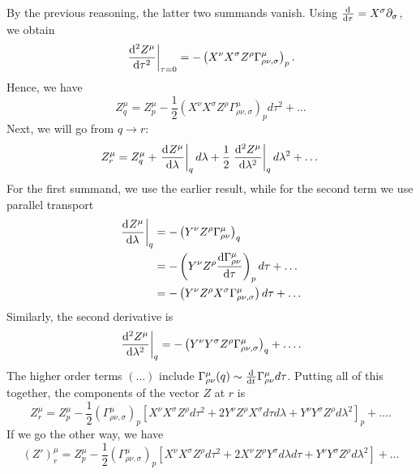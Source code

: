 By the previous reasoning, the latter two summands vanish.
Using $\dv[]{}{\tau} = X^{\sigma} \partial_{\sigma}$, we obtain
\begin{equation}
  \left.\dv[2]{Z^{\mu}}{\tau}\right\rvert_{\tau =0} = - \left( X^{\nu}X^{\sigma} Z^{\rho} \Gamma^{\mu}_{\rho\nu, \sigma} \right)_p.
\end{equation}
Hence, we have
\begin{equation}
  Z^{\mu}_q = Z^{\mu}_p - \frac{1}{2} (X^{\nu}X^{\sigma} Z^{\rho} \Gamma^{\mu}_{\rho\nu, \sigma})_p d\tau^2 + \dots
\end{equation}
Next, we will go from $q \to r$:
\begin{equation}
  Z^{\mu}_r = Z^{\mu}_q + \left.\dv[]{Z^{\mu}}{\lambda}\right\rvert_{q} d\lambda + \frac{1}{2} \left.\dv[2]{Z^{\mu}}{\lambda}\right\rvert_{q} d\lambda^2 + \dots
\end{equation}
For the first summand, we use the earlier result, while for the second term we use parallel transport
\begin{align}
  \left.\dv[]{Z^{\mu}}{\lambda}\right\rvert_{q} &= -\left( Y^{\nu} Z^{\rho} \Gamma^{\mu}_{\rho\nu} \right)_q \\
						&= - \left( Y^{\nu} Z^{\rho} \dv{\Gamma^{\mu}_{\rho\nu}}{\tau} \right)_p d \tau + \dots \\
						&= - \left( Y^{\nu} Z^{\rho} X^{\sigma} \Gamma^{\mu}_{\rho\nu, \sigma} \right) d\tau + \dots
\end{align}
Similarly, the second derivative is
\begin{equation}
  \left.\dv[2]{Z^{\mu}}{\lambda}\right\rvert_{q} = - \left( Y^{\nu}Y^{\sigma} Z^{\rho} \Gamma^{\mu}_{\rho\nu, \sigma} \right)_q + \dots.
\end{equation}
The higher order terms $(\dots)$ include $\Gamma^{\mu}_{\rho\nu}(q) \sim \dv[]{}{t}\Gamma^{\mu}_{\rho\nu} d\tau$.
Putting all of this together, the components of the vector $Z$ at $r$ is
\begin{equation}
  Z^{\mu}_r = Z^{\mu}_p - \frac{1}{2} (\Gamma^{\mu}_{\rho\nu, \sigma})_p \left[ X^{\nu}X^{\sigma} Z^{\rho} d\tau^2 + 2 Y^{\nu}Z^{\rho}X^{\sigma} d\tau d\lambda + Y^{\nu}Y^{\sigma}Z^{\rho} d\lambda^2 \right]_p + \dots.
\end{equation}
If we go the other way, we have
\begin{equation}
  (Z')^{\mu}_r = Z^{\mu}_p - \frac{1}{2} (\Gamma^{\mu}_{\rho\nu, \sigma})_p \left[ X^{\nu}X^{\sigma} Z^{\rho} d\tau^2 + 2 X^{\nu} Z^{\rho} Y^{\sigma} d\lambda d\tau + Y^{\nu} Y^{\sigma} Z^{\rho} d\lambda^2 \right] + \dots
\end{equation}
